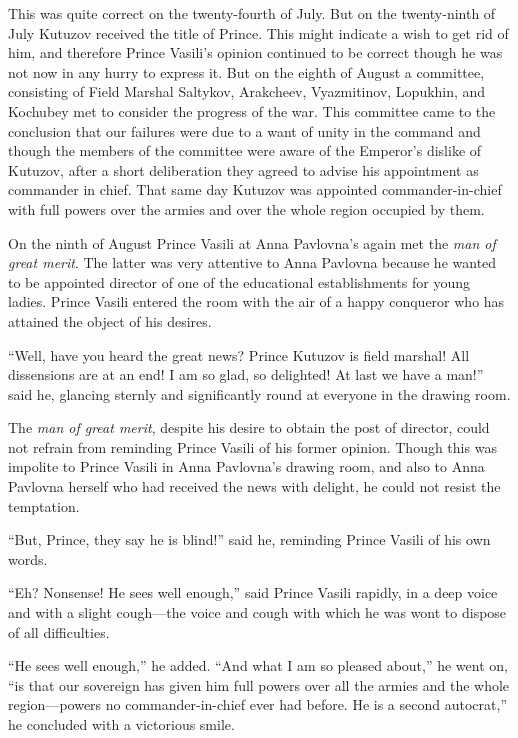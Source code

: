 This was quite correct on the twenty-fourth of July. But on the
twenty-ninth of July Kutuzov received the title of Prince. This
might indicate a wish to get rid of him, and therefore Prince
Vasili's opinion continued to be correct though he was not now in
any hurry to express it. But on the eighth of August a committee,
consisting of Field Marshal Saltykov, Arakcheev, Vyazmitinov,
Lopukhin, and Kochubey met to consider the progress of the
war. This committee came to the conclusion that our failures were
due to a want of unity in the command and though the members of
the committee were aware of the Emperor's dislike of Kutuzov,
after a short deliberation they agreed to advise his appointment
as commander in chief. That same day Kutuzov was appointed
commander-in-chief with full powers over the armies and over the
whole region occupied by them.

On the ninth of August Prince Vasili at Anna Pavlovna's again met
the \emph{man of great merit}. The latter was very attentive to
Anna Pavlovna because he wanted to be appointed director of one
of the educational establishments for young ladies. Prince Vasili
entered the room with the air of a happy conqueror who has
attained the object of his desires.

``Well, have you heard the great news? Prince Kutuzov is field
marshal!  All dissensions are at an end! I am so glad, so
delighted! At last we have a man!'' said he, glancing sternly and
significantly round at everyone in the drawing room.

The \emph{man of great merit}, despite his desire to obtain the
post of director, could not refrain from reminding Prince Vasili
of his former opinion. Though this was impolite to Prince Vasili
in Anna Pavlovna's drawing room, and also to Anna Pavlovna
herself who had received the news with delight, he could not
resist the temptation.

``But, Prince, they say he is blind!'' said he, reminding Prince
Vasili of his own words.

``Eh? Nonsense! He sees well enough,'' said Prince Vasili
rapidly, in a deep voice and with a slight cough---the voice and
cough with which he was wont to dispose of all difficulties.

``He sees well enough,'' he added. ``And what I am so pleased
about,'' he went on, ``is that our sovereign has given him full
powers over all the armies and the whole region---powers no
commander-in-chief ever had before. He is a second autocrat,'' he
concluded with a victorious smile.


